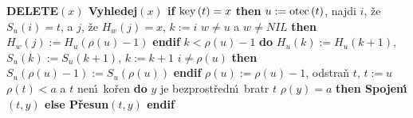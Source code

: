 {\bf DELETE$\left(x\right)$\newline 
Vyhledej$\left(x\right)$\newline 
if} $\operatorname{key}\left(t\right)=x$ {\bf then}\newline 
\phantom{---}$u:=\operatorname{otec}\left(t\right)$, najdi $i$, \v ze $S_u\left(i\right)=t$, a $j$, \v ze $H_w\left(j\right)=x$, $k:=i$\newline 
\phantom{---}{\bf if} $w\ne u$ a $w\ne NIL$ {\bf then} $H_w\left(j\right):=H_u\left(\rho \left(u\right)-1\right)$ {\bf endif}\newline 
\phantom{---}{\bf while} $k<\rho \left(u\right)-1$ {\bf do}\newline 
\phantom{------}$H_u\left(k\right):=H_u\left(k+1\right)$, $S_u\left(k\right):=S_u\left(k+1\right)$, $k:=k+1$ \newline 
\phantom{---}{\bf enddo}\newline 
\phantom{---}{\bf if} $i\ne\rho\left(u\right)$ {\bf then} $S_u\left(\rho \left(u\right)-1\right):=S_u\left(\rho \left(u\right)\right)$ {\bf endif}\newline
\phantom{---}$\rho \left(u\right):=\rho \left(u\right)-1$, odstra\v n $t$, $t:=u$ \newline 
\phantom{---}{\bf while} $\rho \left(t\right)<a$ a $t$ nen\'\i\ ko\v ren {\bf do}\newline 
\phantom{------}$y$ je bezprost\v redn\'\i\ bratr $t$\newline 
\phantom{------}{\bf if} $\rho \left(y\right)=a$ {\bf then Spojen\'\i$\left(t,y\right)$ else P\v resun$
\left(t,y\right)$ endif}\newline 
\phantom{---}{\bf enddo\newline 
endif}
\medskip

